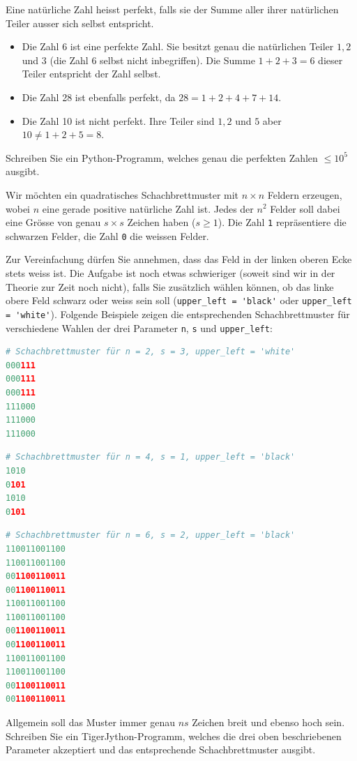 \clearpage
Eine natürliche Zahl heisst perfekt, falls sie der Summe aller ihrer natürlichen Teiler ausser sich selbst entspricht.

\begin{itemize}
    \item Die Zahl 6 ist eine perfekte Zahl. Sie besitzt genau die natürlichen Teiler $1, 2$ und $3$ (die Zahl $6$ selbst nicht inbegriffen). Die Summe $1 + 2 + 3 = 6$ dieser Teiler entspricht der Zahl selbst.
    \item Die Zahl 28 ist ebenfalls perfekt, da $28 = 1 + 2 + 4 + 7 + 14$.
    \item Die Zahl 10 ist nicht perfekt. Ihre Teiler sind $1, 2$ und $5$ aber $10 \neq 1 + 2 + 5 = 8$.
\end{itemize}

\noindent
Schreiben Sie ein Python-Programm, welches genau die perfekten Zahlen $\leq 10^5$ ausgibt.

\clearpage

Wir möchten ein quadratisches Schachbrettmuster mit $n\times n$ Feldern erzeugen, wobei $n$ eine gerade positive natürliche Zahl ist.
Jedes der $n^2$ Felder soll dabei eine Grösse von genau $s\times s$ Zeichen haben ($s\geq 1$). Die Zahl \lstinline|1| repräsentiere die schwarzen Felder, die Zahl \lstinline|0| die weissen Felder.

\noindent
Zur Vereinfachung dürfen Sie annehmen, dass das Feld in der linken oberen Ecke stets weiss ist. Die Aufgabe ist noch etwas schwieriger (soweit sind wir in der Theorie zur Zeit noch nicht), falls Sie zusätzlich wählen können, ob das linke obere Feld schwarz oder weiss sein soll (\lstinline|upper_left = 'black'| oder \lstinline|upper_left = 'white'|). Folgende Beispiele zeigen die entsprechenden Schachbrettmuster für verschiedene Wahlen der drei Parameter \lstinline|n|, \lstinline|s| und \lstinline|upper_left|:

\begin{lstlisting}[language=Python]
# Schachbrettmuster für n = 2, s = 3, upper_left = 'white'
000111
000111
000111
111000
111000
111000
\end{lstlisting}

\begin{lstlisting}[language=Python]
# Schachbrettmuster für n = 4, s = 1, upper_left = 'black'
1010
0101
1010
0101
\end{lstlisting}

\begin{lstlisting}[language=Python]
# Schachbrettmuster für n = 6, s = 2, upper_left = 'black'
110011001100
110011001100
001100110011
001100110011
110011001100
110011001100
001100110011
001100110011
110011001100
110011001100
001100110011
001100110011
\end{lstlisting}
Allgemein soll das Muster immer genau $ns$ Zeichen breit und ebenso hoch sein. Schreiben Sie ein TigerJython-Programm, welches die drei oben beschriebenen Parameter akzeptiert und das entsprechende Schachbrettmuster ausgibt.

